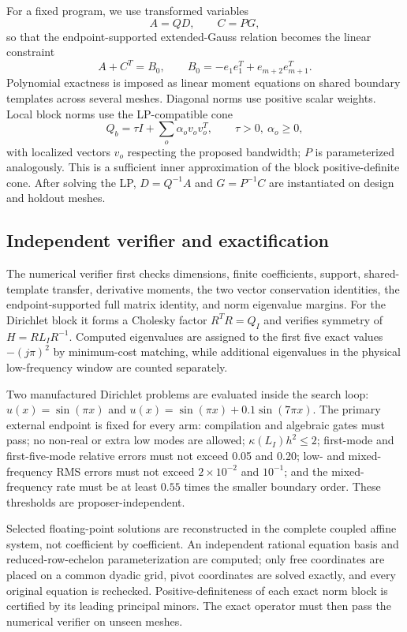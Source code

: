 \documentclass[lineno,pdflatex,sn-nature]{sn-jnl}
\newcommand{\cond}{\kappa}
\theoremstyle{thmstyleone}
\begin{document}
For a fixed program, we use transformed variables
\begin{equation}
A=QD,\qquad C=PG,
\end{equation}
so that the endpoint-supported extended-Gauss relation becomes the linear constraint
\begin{equation}
A+C^T=B_0,\qquad B_0=-e_1e_1^T+e_{m+2}e_{m+1}^T.
\end{equation}
Polynomial exactness is imposed as linear moment equations on shared boundary templates across several meshes. Diagonal norms use positive scalar weights. Local block norms use the LP-compatible cone
\begin{equation}
Q_b=\tau I+\sum_o \alpha_o v_ov_o^T,\qquad \tau>0,\ \alpha_o\ge0,
\end{equation}
with localized vectors $v_o$ respecting the proposed bandwidth; $P$ is parameterized analogously. This is a sufficient inner approximation of the block positive-definite cone. After solving the LP, $D=Q^{-1}A$ and $G=P^{-1}C$ are instantiated on design and holdout meshes.

\subsection{Independent verifier and exactification}
The numerical verifier first checks dimensions, finite coefficients, support, shared-template transfer, derivative moments, the two vector conservation identities, the endpoint-supported full matrix identity, and norm eigenvalue margins. For the Dirichlet block it forms a Cholesky factor $R^TR=Q_I$ and verifies symmetry of $H=RL_IR^{-1}$. Computed eigenvalues are assigned to the first five exact values $-(j\pi)^2$ by minimum-cost matching, while additional eigenvalues in the physical low-frequency window are counted separately.

Two manufactured Dirichlet problems are evaluated inside the search loop: $u(x)=\sin(\pi x)$ and $u(x)=\sin(\pi x)+0.1\sin(7\pi x)$. The primary external endpoint is fixed for every arm: compilation and algebraic gates must pass; no non-real or extra low modes are allowed; $\cond(L_I)h^2\le2$; first-mode and first-five-mode relative errors must not exceed 0.05 and 0.20; low- and mixed-frequency RMS errors must not exceed $2\times10^{-2}$ and $10^{-1}$; and the mixed-frequency rate must be at least $0.55$ times the smaller boundary order. These thresholds are proposer-independent.

Selected floating-point solutions are reconstructed in the complete coupled affine system, not coefficient by coefficient. An independent rational equation basis and reduced-row-echelon parameterization are computed; only free coordinates are placed on a common dyadic grid, pivot coordinates are solved exactly, and every original equation is rechecked. Positive-definiteness of each exact norm block is certified by its leading principal minors. The exact operator must then pass the numerical verifier on unseen meshes.
\end{document}
